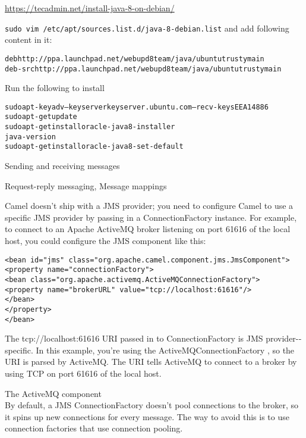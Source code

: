 \documentclass[Screen16to9,17pt]{foils}
\begin{document}
\url{https://tecadmin.net/install-java-8-on-debian/}


\verb+sudo vim /etc/apt/sources.list.d/java-8-debian.list+
and add following content in it:
\begin{alltt}
deb http://ppa.launchpad.net/webupd8team/java/ubuntu trusty main
deb-src http://ppa.launchpad.net/webupd8team/java/ubuntu trusty main
\end{alltt}

Run the following to install
\begin{alltt}
sudo apt-key adv --keyserver keyserver.ubuntu.com --recv-keys EEA14886
sudo apt-get update
sudo apt-get install oracle-java8-installer
java -version
sudo apt-get install oracle-java8-set-default
\end{alltt}



\begin{list2}
\item Sending and receiving messages
\item Request-­reply messaging, Message mappings
\end{list2}


Camel doesn’t ship with a JMS provider; you need to configure Camel to use a specific
JMS provider by passing in a ConnectionFactory instance. For example, to connect to
an Apache ActiveMQ broker listening on port 61616 of the local host, you could configure the JMS component like this:

\begin{verbatim}
<bean id="jms" class="org.apache.camel.component.jms.JmsComponent">
<property name="connectionFactory">
<bean class="org.apache.activemq.ActiveMQConnectionFactory">
<property name="brokerURL" value="tcp://localhost:61616"/>
</bean>
</property>
</bean>
\end{verbatim}

The tcp://localhost:61616 URI passed in to ConnectionFactory is JMS provider-­
specific. In this example, you’re using the ActiveMQConnectionFactory , so the URI is
parsed by ActiveMQ. The URI tells ActiveMQ to connect to a broker by using TCP on
port 61616 of the local host.


The ActiveMQ component\\
By default, a JMS ConnectionFactory doesn’t pool connections to the broker, so it
spins up new connections for every message. The way to avoid this is to use connection
factories that use connection pooling.
\end{document}
